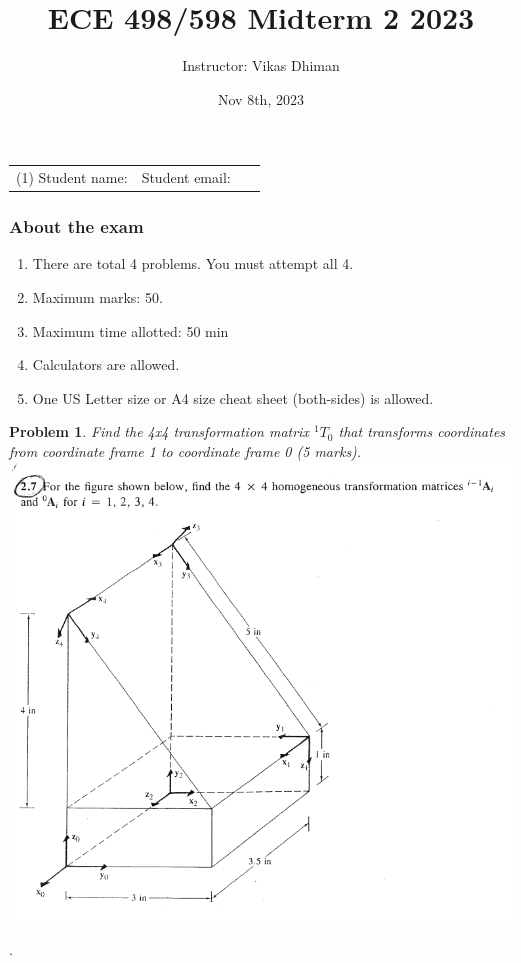 \documentclass{article}
\title{ECE 498/598 Midterm 2 2023}
\date{Nov 8th, 2023}
\author{Instructor: Vikas Dhiman}
\newtheorem{prob}{Problem}
\begin{document}
\maketitle

\begin{tabular}{p{0.5\linewidth}p{0.5\linewidth}}
  (1) Student name:& Student email: \\
\end{tabular}

\subsubsection*{About the exam}
\begin{enumerate}
  \item There are total 4 problems. You must attempt all 4.
  \item Maximum marks: 50.
  \item Maximum time allotted:  50 min
  \item Calculators are allowed.
  \item One US Letter size or A4 size cheat sheet (both-sides) is allowed.
\end{enumerate}

\begin{prob}
  Find the 4x4 transformation matrix $^1T_0$ that transforms coordinates from coordinate frame 1 to coordinate frame 0 (5 marks).\\
  \includegraphics[width=0.7\linewidth,trim=0 0 0 1in,clip]{./media/transformations.png}
\end{prob}
\newpage
.
\newpage
\end{document}
